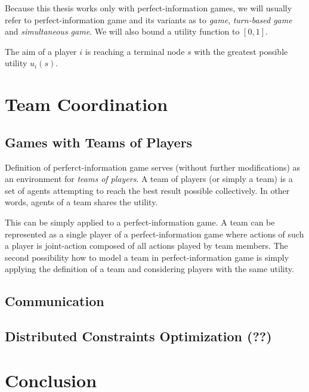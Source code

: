 Because this thesis works only with perfect-information games, we will usually refer to
perfect-information game and its variants as to \emph{game}, \emph{turn-based game} and
\emph{simultaneous game}. We will also bound a utility function to $[0,1]$.

The aim of a player $i$ is reaching a terminal node $s$ with the greatest possible utility
$u_i(s)$.


\section{Team Coordination}

\subsection{Games with Teams of Players}

Definition of perferct-information game serves (without further modifications) as an
environment for \emph{teams of players}. A team of players (or simply a team) is a set of agents
attempting to reach the best result possible collectively. In other words, agents of a team
shares the utility. 

This can be simply applied to a perfect-information game. A team can be represented as a single
player of a perfect-information game where actions of such a player is joint-action composed of
all actions played by team members. The second possibility how to model a team in
perfect-information game is simply applying the definition of a team and considering players
with the same utility.



\subsection{Communication}
\subsection{Distributed Constraints Optimization (??)}

\section{Conclusion}
